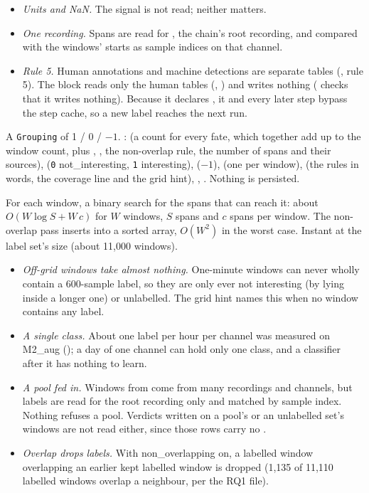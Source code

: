 \begin{itemize}
\item \emph{Units and NaN.} The signal is not read; neither matters.
\item \emph{One recording.} Spans are read for , the chain's root recording,
  and compared with the windows' starts as sample indices on that channel.
\item \emph{Rule 5.} Human annotations and machine detections are separate tables
  (, rule 5). The block reads only the human tables (,
  ) and writes nothing ( checks
  that it writes nothing). Because it declares , it and every later step bypass the step
  cache, so a new label reaches the next run.
\end{itemize}

A \texttt{Grouping} of 1 / 0 / $-1$. :  (a count for every fate, which
together add up to the window count, plus , , the non-overlap rule,
the number of spans and their sources),  (\texttt{0} not\_interesting,
\texttt{1} interesting),  ($-1$),  (one per window), 
(the rules in words, the coverage line and the grid hint), ,
. Nothing is persisted.

For each window, a binary search for the spans that can reach it: about $O(W \log S + W\,c)$ for
$W$ windows, $S$ spans and $c$ spans per window. The non-overlap pass inserts into a sorted array,
$O(W^2)$ in the worst case. Instant at the label set's size (about 11,000 windows).

\begin{itemize}
\item \emph{Off-grid windows take almost nothing.} One-minute windows can never wholly contain a
  600-sample label, so they are only ever not interesting (by lying inside a longer one) or
  unlabelled. The grid hint names this when no window contains any label.
\item \emph{A single class.} About one label per hour per channel was measured on M2\_aug
  (); a day of one channel can hold only one
  class, and a classifier after it has nothing to learn.
\item \emph{A pool fed in.} Windows from  come from many
  recordings and channels, but labels are read for the root recording only and matched by sample
  index. Nothing refuses a pool. Verdicts written on a pool's or an unlabelled set's windows are not
  read either, since those  rows carry no 
  .
\item \emph{Overlap drops labels.} With non\_overlapping on, a labelled window overlapping an
  earlier kept labelled window is dropped (1,135 of 11,110 labelled windows overlap a neighbour, per
  the RQ1 file).
\end{itemize}

